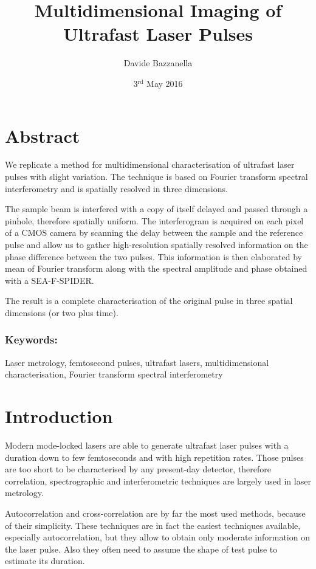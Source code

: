 \documentclass[12pt,a4paper,twoside]{article}
\author{Davide Bazzanella}
\title{Multidimensional Imaging of Ultrafast Laser Pulses}
\date{3$^{\mathrm{rd}}$ May 2016}
\begin{document}

\cleardoublepage
\section*{Abstract}
We replicate a method for multidimensional characterisation of ultrafast laser pulses with slight variation.
The technique is based on Fourier transform spectral interferometry and is spatially resolved in three dimensions.

The sample beam is interfered with a copy of itself delayed and passed through a pinhole, therefore spatially uniform.
The interferogram is acquired on each pixel of a CMOS camera by scanning the delay between the sample and the reference pulse and allow us to gather high-resolution spatially resolved information on the phase difference between the two pulses.
This information is then elaborated by mean of Fourier transform along with the spectral amplitude and phase obtained with a SEA-F-SPIDER.

The result is a complete characterisation of the original pulse in three spatial dimensions (or two plus time).
\subsubsection*{Keywords:} Laser metrology, femtosecond pulses, ultrafast lasers, multidimensional characterisation, Fourier transform spectral interferometry
\cleardoublepage
\tableofcontents

\cleardoublepage
{}
\section{Introduction}
Modern mode-locked lasers are able to generate ultrafast laser pulses with a duration down to few femtoseconds \cite{tamura93,schriever14,yu30} and with high repetition rates.
Those pulses are too short to be characterised by any present-day detector, therefore correlation, spectrographic and interferometric techniques are largely used in laser metrology.

Autocorrelation and cross-correlation are by far the most used methods, because of their simplicity.
These techniques are in fact the easiest techniques available, especially autocorrelation, but they allow to obtain only moderate information on the laser pulse.
Also they often need to assume the shape of test pulse to estimate its duration.
\end{document}

